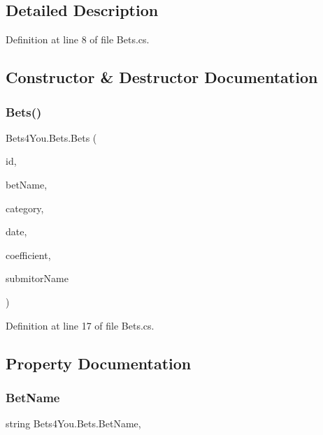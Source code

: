 \subsection{Detailed Description}


Definition at line 8 of file Bets.\+cs.



\subsection{Constructor \& Destructor Documentation}
\mbox{\label{class_bets4_you_1_1_bets_a6188e75bf4e4e76f8a28fe0bbdba9b50}} 
\subsubsection{\texorpdfstring{Bets()}{Bets()}}
{\footnotesize\ttfamily Bets4\+You.\+Bets.\+Bets (\begin{DoxyParamCaption}\item[{int}]{id,  }\item[{string}]{bet\+Name,  }\item[{string}]{category,  }\item[{Date\+Time}]{date,  }\item[{int}]{coefficient,  }\item[{string}]{submitor\+Name }\end{DoxyParamCaption})}



Definition at line 17 of file Bets.\+cs.



\subsection{Property Documentation}
\mbox{\label{class_bets4_you_1_1_bets_ae4ef2f2f1d5e577c053aa32d6b8b51ab}} 
\subsubsection{\texorpdfstring{BetName}{BetName}}
{\footnotesize\ttfamily string Bets4\+You.\+Bets.\+Bet\+Name\hspace{0.3cm}{\ttfamily [get]}, {\ttfamily [set]}}



